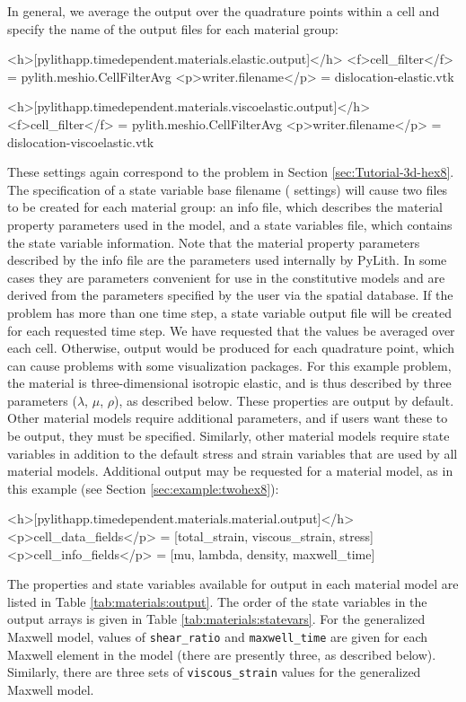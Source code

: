 In general, we average the output over the quadrature points within
a cell and specify the name of the output files for each material
group:
\begin{cfg}
<h>[pylithapp.timedependent.materials.elastic.output]</h>
<f>cell_filter</f> = pylith.meshio.CellFilterAvg
<p>writer.filename</p> = dislocation-elastic.vtk

<h>[pylithapp.timedependent.materials.viscoelastic.output]</h>
<f>cell_filter</f> = pylith.meshio.CellFilterAvg
<p>writer.filename</p> = dislocation-viscoelastic.vtk
\end{cfg}

These settings again correspond to the problem in Section \vref{sec:Tutorial-3d-hex8}.
The specification of a state variable base filename (
settings) will cause two files to be created for each material group:
an info file, which describes the material property parameters used
in the model, and a state variables file, which contains the state
variable information. Note that the material property parameters described
by the info file are the parameters used internally by PyLith. In
some cases they are parameters convenient for use in the constitutive
models and are derived from the parameters specified by the user via
the spatial database. If the problem has more than one time step,
a state variable output file will be created for each requested time
step. We have requested that the values be averaged over each cell.
Otherwise, output would be produced for each quadrature point, which
can cause problems with some visualization packages. For this example
problem, the material is three-dimensional isotropic elastic, and
is thus described by three parameters ($\lambda$, $\mu$, $\rho$),
as described below. These properties are output by default. Other
material models require additional parameters, and if users want these
to be output, they must be specified. Similarly, other material models
require state variables in addition to the default stress and strain
variables that are used by all material models. Additional output
may be requested for a material model, as in this example (see Section
\vref{sec:example:twohex8}):
\begin{cfg}
<h>[pylithapp.timedependent.materials.material.output]</h>
<p>cell_data_fields</p> = [total_strain, viscous_strain, stress]
<p>cell_info_fields</p> = [mu, lambda, density, maxwell_time]
\end{cfg}

The properties and state variables available for output in each
material model are listed in Table
\vref{tab:materials:output}. The order of the state variables in
the output arrays is given in Table \vref{tab:materials:statevars}.
For the generalized Maxwell model, values of \texttt{shear\_ratio} and
\texttt{maxwell\_time} are given for each Maxwell element in the model
(there are presently three, as described below). Similarly, there are
three sets of \texttt{viscous\_strain} values for the generalized
Maxwell model.

